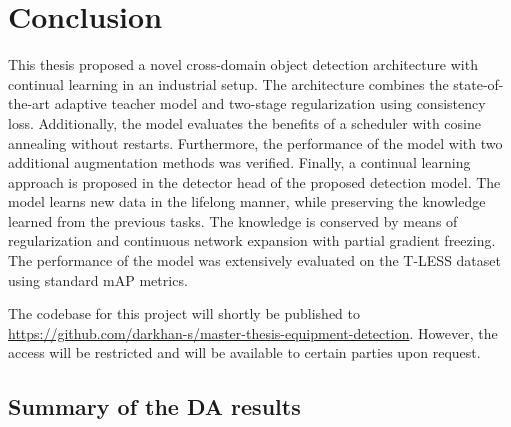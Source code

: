 \documentclass[english, 12pt, a4paper, elec, utf8, a-1b, online]{aaltothesis}
\begin{document}
\clearpage


\section{Conclusion} 

This thesis proposed a novel cross-domain object detection architecture with continual learning in an industrial setup. The architecture combines the state-of-the-art adaptive teacher model and two-stage regularization using consistency loss. Additionally, the model evaluates the benefits of a scheduler with cosine annealing without restarts. Furthermore, the performance of the model with two additional augmentation methods was verified. Finally, a continual learning approach is proposed in the detector head of the proposed detection model. The model learns new data in the lifelong manner, while preserving the knowledge learned from the previous tasks. The knowledge is conserved by means of regularization and continuous network expansion with partial gradient freezing. The performance of the model was extensively evaluated on the T-LESS dataset using standard mAP metrics. 

The codebase for this project will shortly be published to \url{https://github.com/darkhan-s/master-thesis-equipment-detection}. However, the access will be restricted and will be available to certain parties upon request.  

\subsection{Summary of the DA results}
\end{document}
